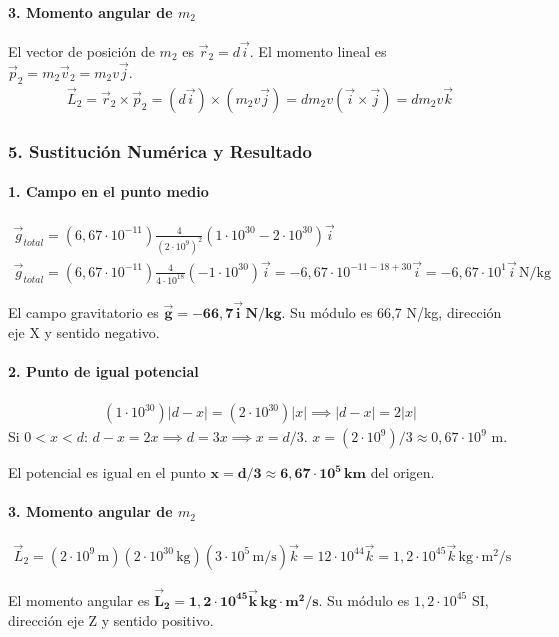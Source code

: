 \paragraph{3. Momento angular de $m_2$}
El vector de posición de $m_2$ es $\vec{r}_2 = d\vec{i}$. El momento lineal es $\vec{p}_2 = m_2 \vec{v}_2 = m_2 v \vec{j}$.
\begin{gather}
    \vec{L}_2 = \vec{r}_2 \times \vec{p}_2 = (d\vec{i}) \times (m_2 v \vec{j}) = d m_2 v (\vec{i} \times \vec{j}) = d m_2 v \vec{k}
\end{gather}

\subsubsection*{5. Sustitución Numérica y Resultado}
\paragraph{1. Campo en el punto medio}
\begin{gather}
    \vec{g}_{total} = (6,67\cdot10^{-11})\frac{4}{(2\cdot10^9)^2}(1\cdot10^{30} - 2\cdot10^{30})\vec{i} \\
    \vec{g}_{total} = (6,67\cdot10^{-11})\frac{4}{4\cdot10^{18}}(-1\cdot10^{30})\vec{i} = -6,67\cdot10^{-11-18+30}\vec{i} = -6,67 \cdot 10^1 \vec{i} \, \text{N/kg}
\end{gather}
\begin{cajaresultado}
El campo gravitatorio es $\boldsymbol{\vec{g} = -66,7 \vec{i} \, \textbf{N/kg}}$. Su módulo es 66,7 N/kg, dirección eje X y sentido negativo.
\end{cajaresultado}

\paragraph{2. Punto de igual potencial}
\begin{gather}
    (1\cdot10^{30})|d-x| = (2\cdot10^{30})|x| \implies |d-x| = 2|x|
\end{gather}
Si $0<x<d$: $d-x=2x \implies d=3x \implies x=d/3$.
$x = (2\cdot10^9)/3 \approx 0,67\cdot10^9$ m.
\begin{cajaresultado}
El potencial es igual en el punto $\boldsymbol{x = d/3 \approx 6,67\cdot10^5 \, \textbf{km}}$ del origen.
\end{cajaresultado}

\paragraph{3. Momento angular de $m_2$}
\begin{gather}
    \vec{L}_2 = (2\cdot10^9 \, \text{m}) (2\cdot10^{30} \, \text{kg}) (3\cdot10^5 \, \text{m/s}) \vec{k} = 12 \cdot 10^{44} \vec{k} = 1,2 \cdot 10^{45} \vec{k} \, \text{kg}\cdot\text{m}^2/\text{s}
\end{gather}
\begin{cajaresultado}
El momento angular es $\boldsymbol{\vec{L}_2 = 1,2 \cdot 10^{45} \vec{k} \, \textbf{kg}\cdot\textbf{m}^2/\textbf{s}}$. Su módulo es $1,2\cdot10^{45}$ SI, dirección eje Z y sentido positivo.
\end{cajaresultado}

